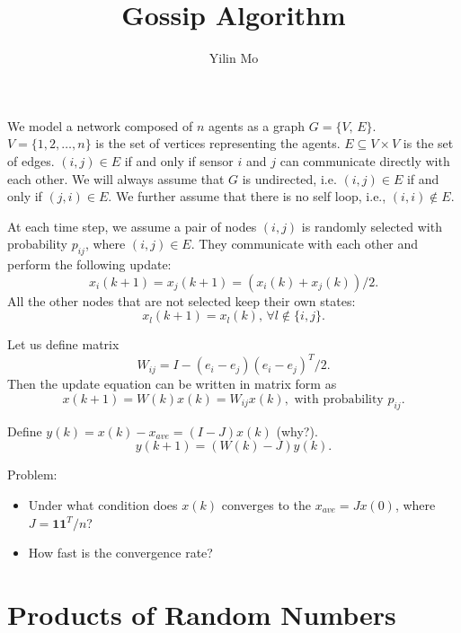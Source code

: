 \documentclass{article}
\title{Gossip Algorithm}
\author{Yilin Mo}
\begin{document}
 \maketitle

We model a network composed of $n$ agents as a graph $G = \{V,\,E\}$. $V = \{1,2,\ldots,n\}$ is the set of vertices representing the agents. $E \subseteq V\times V$ is the set of edges. $(i,j)\in E$ if and only if sensor $i$ and $j$ can communicate directly with each other. We will always assume that $G$ is undirected, i.e. $(i,j)\in E$ if and only if $(j,i)\in E$. We further assume that there is no self loop, i.e., $(i,i)\notin E$.

At each time step, we assume a pair of nodes $(i,j)$ is randomly selected with probability $p_{ij}$, where $(i,j)\in E$. They communicate with each other and perform the following update:
\begin{displaymath}
 x_i(k+1) = x_j(k+1) = (x_i(k)+x_j(k))/2 .
\end{displaymath}
All the other nodes that are not selected keep their own states:
\begin{displaymath}
  x_l(k+1) = x_l(k),\,\forall l\notin \{i,j\}.
\end{displaymath}

Let us define matrix
\begin{displaymath}
  W_{ij} = I - (e_i - e_j)(e_i-e_j)^T/2.
\end{displaymath}
Then the update equation can be written in matrix form as
\begin{displaymath}
  x(k+1) = W(k)x(k) = W_{ij} x(k) ,\text{ with probability }p_{ij}. 
\end{displaymath}

Define $y(k) = x(k) - x_{ave} = (I-J)x(k)$ (why?). 
\begin{displaymath}
 y(k+1) =   (W(k)-J) y(k).
\end{displaymath}

Problem:
\begin{itemize}
  \item Under what condition does $x(k)$ converges to the $x_{ave} = J x(0)$, where $J = \mathbf 1\mathbf 1^T/n$? 
  \item How fast is the convergence rate?
\end{itemize}
\section{Products of Random Numbers}
\end{document}
